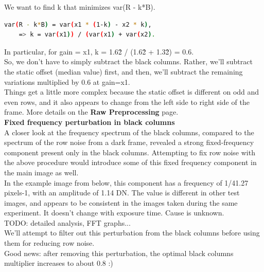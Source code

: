We want to find k that minimizes var(R - k*B). 

\begin{lstlisting}[language=bash,morekeywords=$,keywordstyle=\bfseries,frame=none,xleftmargin=.25in,belowskip=2em, aboveskip=2em]
    var(R - k*B) = var(x1 * (1-k) - x2 * k),
    => k = var(x1)) / (var(x1) + var(x2).
\end{lstlisting}

In particular, for gain = x1, k = 1.6\^2 / (1.6\^2 + 1.3\^2) = 0.6.\\

So, we don't have to simply subtract the black columns. Rather, we'll subtract the static offset (median value) first, and then, we'll subtract the remaining variations multiplied by 0.6 at gain=x1.\\

Things get a little more complex because the static offset is different on odd and even rows, and it also appears to change from the left side to right side of the frame. More details on the \textbf{Raw Preprocessing} page.\\

\textbf{Fixed frequency perturbation in black columns }\\

A closer look at the frequency spectrum of the black columns, compared to the spectrum of the row noise from a dark frame, revealed a strong fixed-frequency component present only in the black columns. Attempting to fix row noise with the above procedure would introduce some of this fixed frequency component in the main image as well.\\

In the example image from below, this component has a frequency of 1/41.27 pixels-1, with an amplitude of 1.14 DN. The value is different in other test images, and appears to be consistent in the images taken during the same experiment. It doesn't change with exposure time. Cause is unknown. \\

TODO: detailed analysis, FFT graphs...\\

We'll attempt to filter out this perturbation from the black columns before using them for reducing row noise.\\

Good news: after removing this perturbation, the optimal black columns multiplier increases to about 0.8 :) \\

